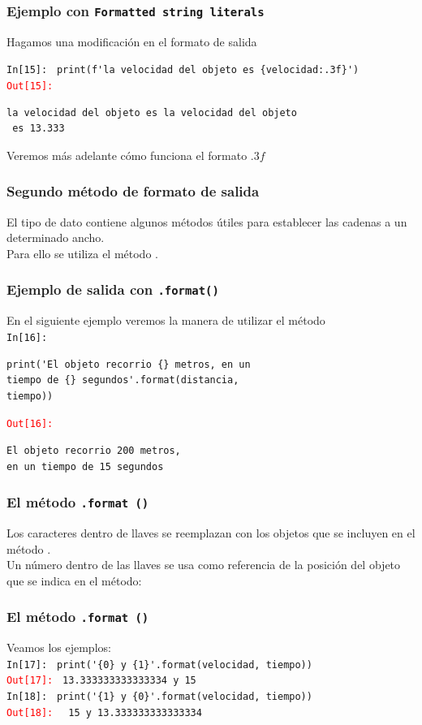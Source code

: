 \begin{frame}[fragile]
\frametitle{Ejemplo con \texttt{Formatted string literals}}
Hagamos una modificación en el formato de salida
\\
\bigskip
\pause
{\fontsize{13}{13}\selectfont
\textcolor{ao}{\texttt{In[15]: }} \verb|print(f'la velocidad del objeto es {velocidad:.3f}')|
\\
\pause
\textcolor{red}{\texttt{Out[15]: }}
\begin{verbatim}
la velocidad del objeto es la velocidad del objeto
 es 13.333
\end{verbatim}
}
Veremos más adelante cómo funciona el formato $.3f$
\end{frame}
\begin{frame}[fragile]
\frametitle{Segundo método de formato de salida}
El tipo de dato  contiene algunos métodos útiles para establecer las cadenas a un determinado ancho.
\\
\bigskip
Para ello se utiliza el método .
\end{frame}
\begin{frame}[fragile]
\frametitle{Ejemplo de salida con \texttt{.format()} }
En el siguiente ejemplo veremos la manera de utilizar el método 
\\
\bigskip
\pause
\textcolor{ao}{\texttt{In[16]: }} 
\begin{verbatim}
print('El objeto recorrio {} metros, en un 
tiempo de {} segundos'.format(distancia, 
tiempo))
\end{verbatim}
\pause
\textcolor{red}{\texttt{Out[16]: }}
\begin{verbatim}
El objeto recorrio 200 metros, 
en un tiempo de 15 segundos
\end{verbatim}
\end{frame}
\begin{frame}[fragile]
\frametitle{El método \texttt{.format ()}}
Los caracteres dentro de llaves se reemplazan con los objetos que se incluyen en el método .
\\
\bigskip
Un número dentro de las llaves se usa como referencia de la posición del objeto que se indica en el método:
\end{frame}
\begin{frame}[fragile]
\frametitle{El método \texttt{.format ()}}
Veamos los ejemplos:
\\
\bigskip
\textcolor{ao}{\texttt{In[17]: }} \verb|print('{0} y {1}'.format(velocidad, tiempo))|
\\
\bigskip
\pause
\textcolor{red}{\texttt{Out[17]: }} \verb|13.333333333333334 y 15|
\\
\bigskip
\pause
\textcolor{ao}{\texttt{In[18]: }} \verb|print('{1} y {0}'.format(velocidad, tiempo))|
\\
\bigskip
\pause
\textcolor{red}{\texttt{Out[18]: }} \verb| 15 y 13.333333333333334|
\end{frame}
